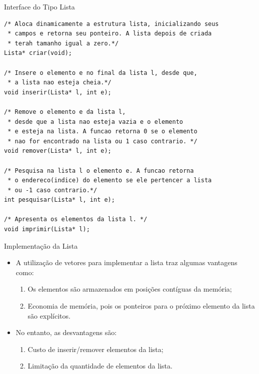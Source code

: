 \begin{frame}{Interface do Tipo Lista}
\footnotesize
\begin{lstlisting}
/* Aloca dinamicamente a estrutura lista, inicializando seus
 * campos e retorna seu ponteiro. A lista depois de criada
 * terah tamanho igual a zero.*/
Lista* criar(void);

/* Insere o elemento e no final da lista l, desde que,
 * a lista nao esteja cheia.*/
void inserir(Lista* l, int e);

/* Remove o elemento e da lista l,
 * desde que a lista nao esteja vazia e o elemento
 * e esteja na lista. A funcao retorna 0 se o elemento 
 * nao for encontrado na lista ou 1 caso contrario. */
void remover(Lista* l, int e);

/* Pesquisa na lista l o elemento e. A funcao retorna 
 * o endereco(indice) do elemento se ele pertencer a lista
 * ou -1 caso contrario.*/
int pesquisar(Lista* l, int e);

/* Apresenta os elementos da lista l. */
void imprimir(Lista* l);
\end{lstlisting}
\end{frame}

\begin{frame}{Implementação da Lista}
\begin{itemize}
	\item A utilização de vetores para implementar a lista traz algumas vantagens como:	
		\begin{enumerate}
			\item Os elementos são armazenados em posições contíguas da memória;
			\item Economia de memória, pois os ponteiros para o próximo elemento da lista são explícitos.
		\end{enumerate}
		\item No entanto, as desvantagens são:		
			\begin{enumerate}
				\item Custo de inserir/remover elementos da lista;
				\item Limitação da quantidade de elementos da lista.
			\end{enumerate}
\end{itemize}
\end{frame}

